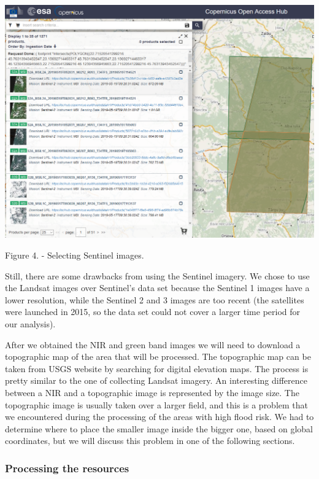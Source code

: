 \documentclass[12pt, a4paper]{report}
\begin{document}
\includegraphics[scale=0.5, center]{sentinel.png} 
\begin{center}
Figure 4. \cite{Copernicus} - Selecting Sentinel images.
\end{center}
\par 


Still, there are some drawbacks from using the Sentinel imagery. We chose to use the Landsat images over Sentinel's data set because the Sentinel 1 images have a lower resolution, while the Sentinel 2 and 3 images are too recent (the satellites were launched in 2015, so the data set could not cover a larger time period for our analysis).
\par 

After we obtained the NIR and green band images we will need to download a topographic map of the area that will be processed. The topographic map can be taken from USGS website by searching for digital elevation maps. The process is pretty similar to the one of collecting Landsat imagery. An interesting difference between a NIR and a topographic image is represented by the image size. The topographic image is usually taken over a larger field, and this is a problem that we encountered during the processing of the areas with high flood risk. We had to determine where to place the smaller image inside the bigger one, based on global coordinates, but we will discuss this problem in one of the following sections.
\par

\subsubsection{Processing the resources}
\end{document}
